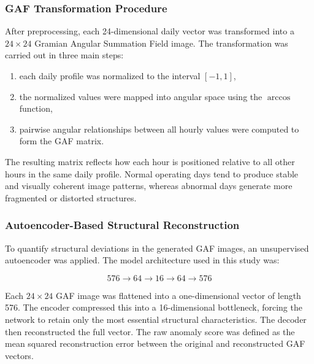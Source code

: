 \documentclass{article}
\begin{document}
\subsubsection{GAF Transformation Procedure}

After preprocessing, each 24-dimensional daily vector was transformed into a $24 \times 24$ Gramian Angular Summation Field image. The transformation was carried out in three main steps:

\begin{enumerate}
    \item each daily profile was normalized to the interval $[-1,1]$,
    \item the normalized values were mapped into angular space using the $\arccos$ function,
    \item pairwise angular relationships between all hourly values were computed to form the GAF matrix.
\end{enumerate}

The resulting matrix reflects how each hour is positioned relative to all other hours in the same daily profile. Normal operating days tend to produce stable and visually coherent image patterns, whereas abnormal days generate more fragmented or distorted structures.

\subsubsection{Autoencoder-Based Structural Reconstruction}

To quantify structural deviations in the generated GAF images, an unsupervised autoencoder was applied. The model architecture used in this study was:

\[
576 \rightarrow 64 \rightarrow 16 \rightarrow 64 \rightarrow 576
\]

Each $24 \times 24$ GAF image was flattened into a one-dimensional vector of length 576. The encoder compressed this into a 16-dimensional bottleneck, forcing the network to retain only the most essential structural characteristics. The decoder then reconstructed the full vector. The raw anomaly score was defined as the mean squared reconstruction error between the original and reconstructed GAF vectors.
\end{document}
